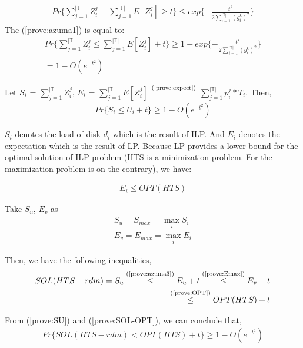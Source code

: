 \documentclass[conference]{IEEEtran}
\begin{document}
\begin{align}
Pr\{\sum_{j = 1}^{|\mathbb{T}|} Z_i^j - 
	\sum_{j = 1}^{|\mathbb{T}|} E[Z_i^j]\geq t\} \leq exp\{-\frac{t^2}{2\sum_{ i = 1 }^{|\mathbb{T}|}(g_i^k)^2}\} \label{prove:azuma1}
\end{align}
 The (\ref{prove:azuma1}) is equal to:
\begin{align}
Pr\{\sum_{j = 1}^{|\mathbb{T}|} Z_i^j \leq \sum_{j = 1}^{|\mathbb{T}|} E[Z_i^j] + t\} \geq 1 - exp\{-\frac{t^2}{2\sum_{ i = 1 }^{|\mathbb{T}|}(g_i^k)^2}\}\nonumber\\
= 1 - O(e^{-t^2})\label{prove:azuma3}
\end{align}

Let $S_i$  = $\sum_{j = 1}^{|\mathbb{T}|} Z_i^j$,
$E_i$ = $\sum_{j = 1}^{|\mathbb{T}|} E[Z_i^j]$
$\overset{\text{(\ref{prove:expect})}}{=}$
$\sum_{j = 1}^{|\mathbb{T}|} p_i^j*T_i$. Then,
\begin{align}
Pr\{S_i \leq U_i + t\} \geq 1- O(e^{-t^2}) \label{prove:SU}
\end{align}

$S_i$ denotes the load of disk $d_i$ which is the result of ILP. And $E_i$ denotes the expectation which is the result of LP. Because LP provides a lower bound for the optimal solution of ILP problem (HTS is a minimization problem. For the maximization problem is on the contrary), we have:



\begin{align}
E_i \leq OPT(HTS)\label{prove:OPT}
\end{align}

Take $S_u$, $E_v$ as
\begin{align}
	S_u = S_{max} = \max_i S_i\\
	E_v = E_{max} = \max_i E_i\label{prove:Emax}
\end{align}

Then, we have the following inequalities,
\begin{align}
SOL(HTS-rdm) = S_u  
\overset{\text{(\ref{prove:azuma3})}}{\leq}  E_u+t
\overset{\text{(\ref{prove:Emax})}}{\leq} E_v+t\nonumber\\
\overset{\text{(\ref{prove:OPT})}}{\leq} OPT(HTS)+t\label{prove:SOL-OPT}
\end{align}

From (\ref{prove:SU}) and (\ref{prove:SOL-OPT}), we can conclude that,
\begin{align}
Pr\{SOL(HTS-rdm)<OPT (HTS)+t\} \geq 1 - O(e^{-t^2})\label{prove:result}
\end{align}
\end{document}
